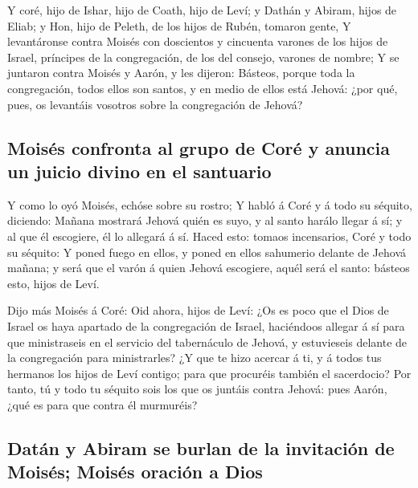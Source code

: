  Y coré, hijo de Ishar, hijo de Coath, hijo de Leví; y
Dathán y Abiram, hijos de Eliab; y Hon, hijo de Peleth, de los hijos de
Rubén, tomaron gente,  Y levantáronse contra Moisés con
doscientos y cincuenta varones de los hijos de Israel, príncipes de la
congregación, de los del consejo, varones de nombre;  Y se
juntaron contra Moisés y Aarón, y les dijeron: Básteos, porque toda la
congregación, todos ellos son santos, y en medio de ellos está Jehová:
¿por qué, pues, os levantáis vosotros sobre la congregación de Jehová?

\hypertarget{moisuxe9s-confronta-al-grupo-de-coruxe9-y-anuncia-un-juicio-divino-en-el-santuario}{%
\subsection{Moisés confronta al grupo de Coré y anuncia un juicio divino
en el
santuario}\label{moisuxe9s-confronta-al-grupo-de-coruxe9-y-anuncia-un-juicio-divino-en-el-santuario}}

 Y como lo oyó Moisés, echóse sobre su rostro; 
Y habló á Coré y á todo su séquito, diciendo: Mañana mostrará Jehová
quién es suyo, y al santo harálo llegar á sí; y al que él escogiere, él
lo allegará á sí.  Haced esto: tomaos incensarios, Coré y
todo su séquito:  Y poned fuego en ellos, y poned en ellos
sahumerio delante de Jehová mañana; y será que el varón á quien Jehová
escogiere, aquél será el santo: básteos esto, hijos de Leví.

 Dijo más Moisés á Coré: Oid ahora, hijos de Leví:
 ¿Os es poco que el Dios de Israel os haya apartado de la
congregación de Israel, haciéndoos allegar á sí para que ministraseis en
el servicio del tabernáculo de Jehová, y estuvieseis delante de la
congregación para ministrarles?  ¿Y que te hizo acercar á
ti, y á todos tus hermanos los hijos de Leví contigo; para que procuréis
también el sacerdocio?  Por tanto, tú y todo tu séquito
sois los que os juntáis contra Jehová: pues Aarón, ¿qué es para que
contra él murmuréis?

\hypertarget{datuxe1n-y-abiram-se-burlan-de-la-invitaciuxf3n-de-moisuxe9s-moisuxe9s-oraciuxf3n-a-dios}{%
\subsection{Datán y Abiram se burlan de la invitación de Moisés; Moisés
oración a
Dios}\label{datuxe1n-y-abiram-se-burlan-de-la-invitaciuxf3n-de-moisuxe9s-moisuxe9s-oraciuxf3n-a-dios}}

